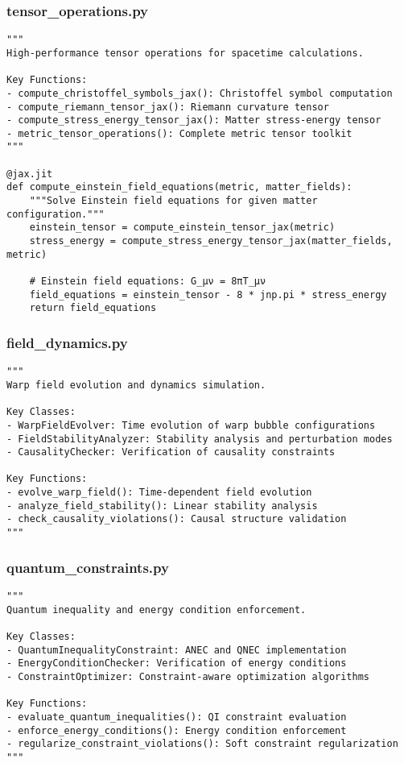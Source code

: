 \documentclass{article}
\begin{document}
\subsubsection{tensor\_operations.py}
\begin{lstlisting}
"""
High-performance tensor operations for spacetime calculations.

Key Functions:
- compute_christoffel_symbols_jax(): Christoffel symbol computation
- compute_riemann_tensor_jax(): Riemann curvature tensor
- compute_stress_energy_tensor_jax(): Matter stress-energy tensor
- metric_tensor_operations(): Complete metric tensor toolkit
"""

@jax.jit
def compute_einstein_field_equations(metric, matter_fields):
    """Solve Einstein field equations for given matter configuration."""
    einstein_tensor = compute_einstein_tensor_jax(metric)
    stress_energy = compute_stress_energy_tensor_jax(matter_fields, metric)
    
    # Einstein field equations: G_μν = 8πT_μν
    field_equations = einstein_tensor - 8 * jnp.pi * stress_energy
    return field_equations
\end{lstlisting}

\subsubsection{field\_dynamics.py}
\begin{lstlisting}
"""
Warp field evolution and dynamics simulation.

Key Classes:
- WarpFieldEvolver: Time evolution of warp bubble configurations
- FieldStabilityAnalyzer: Stability analysis and perturbation modes
- CausalityChecker: Verification of causality constraints

Key Functions:
- evolve_warp_field(): Time-dependent field evolution
- analyze_field_stability(): Linear stability analysis
- check_causality_violations(): Causal structure validation
"""
\end{lstlisting}

\subsubsection{quantum\_constraints.py}
\begin{lstlisting}
"""
Quantum inequality and energy condition enforcement.

Key Classes:
- QuantumInequalityConstraint: ANEC and QNEC implementation
- EnergyConditionChecker: Verification of energy conditions
- ConstraintOptimizer: Constraint-aware optimization algorithms

Key Functions:
- evaluate_quantum_inequalities(): QI constraint evaluation
- enforce_energy_conditions(): Energy condition enforcement
- regularize_constraint_violations(): Soft constraint regularization
"""
\end{lstlisting}
\end{document}

